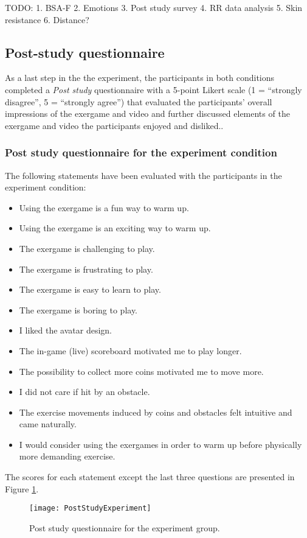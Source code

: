 TODO:
1. BSA-F
2. Emotions
3. Post study survey 
4. RR data analysis
5. Skin resistance
6. Distance?
\subsection{Post-study questionnaire}
As a last step in the the experiment, the participants in both conditions completed  a \textit{Post study} questionnaire  with a 5-point Likert scale (1 = ``strongly disagree'', 5 = ``strongly agree'') that evaluated the participants' overall impressions of the exergame and video and further discussed elements of the exergame and video the participants enjoyed and disliked.. 
\subsubsection{Post study questionnaire for the experiment condition} 
The following statements have been evaluated with the participants in the experiment condition:
\begin{itemize}
 \item Using the exergame is a fun way to warm up.
 \item  Using the exergame is an exciting way to warm up.
 \item  The exergame is challenging to play.
 \item  The exergame is frustrating to play.
 \item  The exergame is easy to learn to play.
  \item The exergame is boring to play.
  \item I liked the avatar design.
  \item The in-game (live) scoreboard motivated me to play longer.
  \item The possibility to collect more coins motivated me to move more.
 \item  I did not care if hit by an obstacle. 
 \item  The exercise movements induced by coins and obstacles felt intuitive and came naturally. 
 \item I would consider using the exergames in order to warm up before physically more demanding exercise.
\end{itemize}
The scores for each statement except the last three questions are presented in Figure \ref{fig:poststudyexperiment}.\\
\begin{figure}[h]
    \centering
    \texttt{[image: PostStudyExperiment]}
    \caption{Post study questionnaire for the experiment group.}
    \label{fig:poststudyexperiment}
\end{figure}\\
